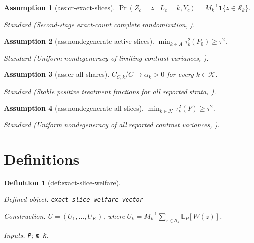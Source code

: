 \documentclass{article}
\newtheorem{assumption}{Assumption}
\newtheorem{definition}{Definition}
\begin{document}
\begin{assumption}[ass:cr-exact-slices]\label{ass:cr-exact-slices}
\(\Pr(Z_c=z\mid L_c=k,Y_c)=M_k^{-1}\mathbf 1\{z\in\mathcal S_k\}\).
\par\smallskip\noindent\emph{Standard} (Second-stage exact-count complete randomization, \cite{BasseFeller2018}).
\end{assumption}

\begin{assumption}[ass:nondegenerate-active-slices]\label{ass:nondegenerate-active-slices}
\(\min_{k\in A}\tau_k^2(P_0)\geq\underline\tau^2\).
\par\smallskip\noindent\emph{Standard} (Uniform nondegeneracy of limiting contrast variances, \cite{vanDerVaart1998}).
\end{assumption}

\begin{assumption}[ass:cr-all-shares]\label{ass:cr-all-shares}
\(C_{C,k}/C\to\alpha_k>0\) for every \(k\in\mathcal K\).
\par\smallskip\noindent\emph{Standard} (Stable positive treatment fractions for all reported strata, \cite{BasseFeller2018}).
\end{assumption}

\begin{assumption}[ass:nondegenerate-all-slices]\label{ass:nondegenerate-all-slices}
\(\min_{k\in\mathcal K}\tau_k^2(P)\geq\underline\tau^2\).
\par\smallskip\noindent\emph{Standard} (Uniform nondegeneracy of all reported contrast variances, \cite{vanDerVaart1998}).
\end{assumption}

\section{Definitions}

\begin{definition}[def:exact-slice-welfare]\label{def:exact-slice-welfare}
\par\smallskip\noindent\emph{Defined object.} \texttt{exact-\allowbreak{}slice welfare vector}
\par\smallskip\noindent\emph{Construction.} \(U=(U_1,\ldots,U_K)\), where \(U_k=M_k^{-1}\sum_{z\in\mathcal S_k}\mathbb E_P[W(z)]\).
\par\smallskip\noindent\emph{Inputs.} \texttt{P}; \texttt{m\_\allowbreak{}k}.
\end{definition}
\end{document}
